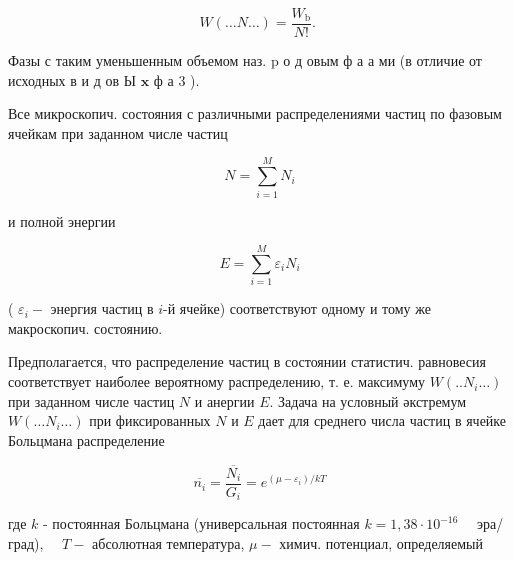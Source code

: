 \documentclass[10pt]{article}
\begin{document}
\[

W(\ldots N \ldots)=\frac{W_{\mathrm{b}}}{N !} \text {. }

\]



Фазы с таким уменьшенным объемом наз. $\mathrm{p}$ о д овым ф а а ми (в отличие от исходных в и д ов Ы $\mathbf{x}$ ф а 3 ).



Все микроскопич. состояния с различными распределениями частиц по фазовым ячейкам при заданном числе частиц



\[

N=\sum_{i=1}^{M} N_{i}

\]



и полной энергии



\[

E=\sum_{i=1}^{M} \varepsilon_{i} N_{i}

\]



( $\varepsilon_{i}-$ энергия частиц в $i$-й ячейке) соответствуют одному и тому же макроскопич. состоянию.



Предполагается, что распределение частиц в состоянии статистич. равновесия соответствует наиболее вероятному распределению, т. е. максимуму $W\left(. . N_{i} \ldots\right)$ при заданном числе частиц $N$ и анергии $E$. Задача на условный әкстремум $W\left(\ldots N_{i} \ldots\right)$ при фиксированных $N$ и $E$ дает для среднего числа частиц в ячейке Больцмана распределение



\[

\overline{n_{i}}=\frac{\overline{N_{i}}}{G_{i}}=e^{\left(\mu-\varepsilon_{i}\right) / k T}

\]



где $k$ - постоянная Больцмана (универсальная постоянная $k=1,38 \cdot 10^{-16} \quad$ эра/град), $\quad T-$ абсолютная температура, $\mu-$ химич. потенциал, определяемый
\end{document}

